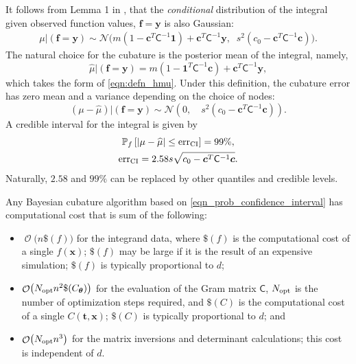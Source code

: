 \documentclass{svjour3}                     %
\DeclareMathOperator{\Order}{{\mathcal O}}
\newcommand{\bm}[1]{\boldsymbol{#1}}
\newcommand{\vtheta}{{\bm{\theta}}}
\newcommand{\vc}{\bm{c}}
\newcommand{\vf}{\bm{f}}
\newcommand{\vt}{\bm{t}}
\newcommand{\vx}{\bm{x}}
\newcommand{\vy}{\bm{y}}
\newcommand{\vone}{\bm{1}}
\newcommand{\mC}{\mathsf{C}}
\newcommand{\opt}{{\textup{opt}}}
\newcommand{\calN}{\mathcal{N}}
\newcommand{\hmu}{\widehat{\mu}}
\newcommand{\CI}{\textup{CI}}
\newcommand{\err}{\textup{err}}
\begin{document}
It follows from Lemma 1 
in \cite{JagHic19a}, that the \emph{conditional} distribution of the integral given observed function values, $\vf = \vy$ is also Gaussian:
\begin{align} \label{eqn:condInteg}
\mu | (\vf = \vy) \sim \calN \bigl(m (1 - \vc^T \mC^{-1} \vone)  + \vc^T \mC^{-1} \vy, \;\;
s^2(c_0  -\vc ^T \mC^{-1} \vc) \bigr).
\end{align}
The natural choice for  the cubature is the posterior mean of the integral, namely, 
\begin{equation}
\label{eqn:BayesCub}
\widehat{\mu}  \vert ( \vf = \vy)
= m(1 - \vone^T  \mC^{-1}\vc )
+ \vc^T \mC^{-1} \vy,
\end{equation}
which takes the form of \eqref{eqn:defn_hmu}.
Under this definition, the cubature error has zero mean and a variance depending on the choice of nodes:
\begin{equation*}
(\mu-\hmu) | (\vf = \vy)
\sim  \calN 
\left(
0, \quad
s^2 (c_0 - \vc^T\mC^{-1}\vc) 
\right).
\end{equation*}
A credible interval for the integral is given by 
\begin{subequations} \label{eqn_prob_confidence_interval}
	\begin{gather}
	\mathbb{P}_f \left[
	|\mu-\hmu| \leq \err_{\CI}
	\right] = 99\%, \\
	\err_{\CI} = 2.58 s \sqrt{c_{0} - \vc^T\mC^{-1}\vc}.
	\end{gather}
\end{subequations}
Naturally, $2.58$ and $99\%$ can be replaced by other quantiles and credible levels.



Any Bayesian cubature algorithm based on \eqref{eqn_prob_confidence_interval} has  computational cost that is sum of the following:
\begin{itemize}
	\item $\Order\bigl(n\$(f) \bigr)$ for the integrand data, where $\$(f)$ is the computational cost of a single $f(\vx)$; $\$(f)$ may be large if it is the result of an expensive simulation; $\$(f)$ is typically proportional to $d$;
	
	\item $\Order\bigl(N_{\opt} n^2 \$(C_\vtheta) \bigr)$ for the evaluation of the Gram matrix $\mC$, $N_\opt$ is the number of optimization steps required, and  $\$(C)$ is the computational cost of a single $C(\vt,\vx)$; $\$(C)$ is typically proportional to $d$; and
	
	\item $\Order\bigl(N_{\opt} n^3 \bigr)$ for the matrix inversions and determinant calculations; this cost is independent of $d$.
	
\end{itemize}
\end{document}
